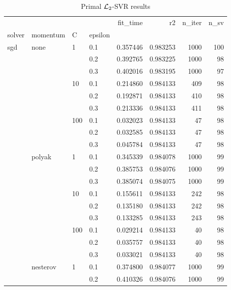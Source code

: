 \begin{table}[H]
\centering
\caption{Primal $\protect \mathcal{L}_2$-SVR results}
\label{primal_l2_svr_cv_results}
\begin{tabular}{llllrrrr}
\toprule
          &   &     &     &  fit\_time &        r2 &  n\_iter &  n\_sv \\
solver & momentum & C & epsilon &           &           &         &       \\
\midrule
sgd & none & 1   & 0.1 &  0.357446 &  0.983253 &    1000 &   100 \\
          &   &     & 0.2 &  0.392765 &  0.983225 &    1000 &    98 \\
          &   &     & 0.3 &  0.402016 &  0.983195 &    1000 &    97 \\
          &   & 10  & 0.1 &  0.214860 &  0.984133 &     409 &    98 \\
          &   &     & 0.2 &  0.192871 &  0.984133 &     410 &    98 \\
          &   &     & 0.3 &  0.213336 &  0.984133 &     411 &    98 \\
          &   & 100 & 0.1 &  0.032023 &  0.984133 &      47 &    98 \\
          &   &     & 0.2 &  0.032585 &  0.984133 &      47 &    98 \\
          &   &     & 0.3 &  0.045784 &  0.984133 &      47 &    98 \\
          & polyak & 1   & 0.1 &  0.345339 &  0.984078 &    1000 &    99 \\
          &   &     & 0.2 &  0.385753 &  0.984076 &    1000 &    99 \\
          &   &     & 0.3 &  0.385074 &  0.984075 &    1000 &    99 \\
          &   & 10  & 0.1 &  0.155611 &  0.984133 &     242 &    98 \\
          &   &     & 0.2 &  0.135180 &  0.984133 &     242 &    98 \\
          &   &     & 0.3 &  0.133285 &  0.984133 &     243 &    98 \\
          &   & 100 & 0.1 &  0.029214 &  0.984133 &      40 &    98 \\
          &   &     & 0.2 &  0.035757 &  0.984133 &      40 &    98 \\
          &   &     & 0.3 &  0.033021 &  0.984133 &      40 &    98 \\
          & nesterov & 1   & 0.1 &  0.374800 &  0.984077 &    1000 &    99 \\
          &   &     & 0.2 &  0.410326 &  0.984076 &    1000 &    99 \\

\end{tabular}
\end{table}
